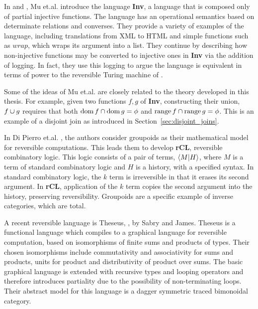 In \cite{mu06bidirectional} and \cite{muetal04:injreversible}, Mu et.al. introduce the language
\textbf{Inv}, a language that is composed only of partial injective functions. The language has an
operational semantics based on determinate relations and converses. They provide a variety of examples of the
language, including translations from XML to HTML and simple functions such as $wrap$, which wraps
its argument into a list. They continue by describing how non-injective functions may be converted to
injective ones in \textbf{Inv} via the addition of logging. In fact, they use this logging to argue
the language is equivalent in terms of power to the reversible Turing machine of
\cite{bennett:1973reverse}.

Some of the ideas of Mu et.al. are closely related to the theory developed in this thesis. For
example,  given two functions $f,g$ of \textbf{Inv}, constructing their union, $f\cup g$ requires
that both $\operatorname*{dom} f \cap \operatorname*{dom} g = \phi$ and $\operatorname*{range} f \cap \operatorname*{range} g =
\phi$. This is an example of a disjoint join as introduced in Section~\ref{sec:disjoint_joins}.

In Di Pierro et.al. \cite{DiPierro200625}, the authors consider groupoids as their mathematical
model for reversible computations. This leads them to develop \textbf{rCL}, reversible combinatory
logic. This logic consists of a pair of terms, $\langle M|H\rangle$, where $M$ is a term of standard combinatory
logic and $H$ is a history, with a specified syntax. In standard combinatory logic, the $k$ term is
irreversible in that it erases its second argument. In \textbf{rCL}, application of the $k$ term
copies the second argument into the history, preserving reversibility. Groupoids are a specific
example of inverse categories, which are total.

A recent reversible language is Theseus, \cite{james2014theseus}, by Sabry and James. Theseus is a
functional language which compiles to a graphical language
\cite{james2013isomorphic,james2012information} for reversible computation, based on
isomorphisms of finite sums and products of types. Their chosen isomorphisms include commutativity
and associativity for sums and products, units for product and distributivity of product over
sums. The basic graphical language is extended with recursive types and looping operators and
therefore introduces partiality due to the possibility of non-terminating loops. Their abstract
model for this language is a dagger symmetric traced bimonoidal category\cite{selinger05:dagger}.

